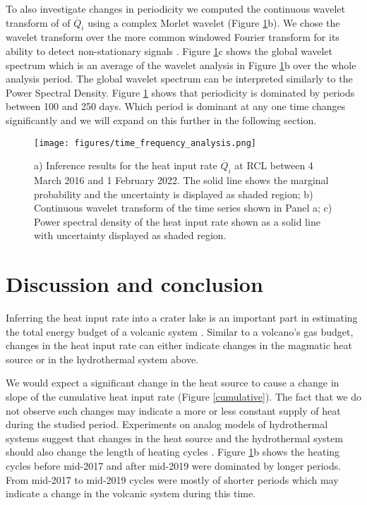 \documentclass{bmcart}
\begin{document}
To also investigate changes in periodicity we computed the continuous wavelet
transform of of $\dot{Q_i}$ using a complex Morlet wavelet (Figure
\ref{inference_result}b). We chose the wavelet transform over the more common
windowed Fourier transform for its ability to detect non-stationary signals
\cite{torrencePracticalGuideWavelet1998}. Figure \ref{inference_result}c shows
the global wavelet spectrum which is an average of the wavelet analysis in
Figure \ref{inference_result}b over the whole analysis period. The global
wavelet spectrum can be interpreted similarly to the Power Spectral Density.
Figure \ref{inference_result} shows that periodicity is dominated by periods
between 100 and 250 days. Which period is dominant at any one time changes
significantly and we will expand on this further in the following section.  

\begin{figure}
 	\texttt{[image: figures/time\_frequency\_analysis.png]}  
    \caption{ a) Inference results for the heat input rate $\dot{Q_i}$ at RCL
             between 4 March 2016 and 1 February 2022. The solid line shows the
             marginal probability and the uncertainty is displayed as shaded
             region; b) Continuous wavelet transform of the time series shown in
             Panel a; c) Power spectral density of the heat input rate shown as a
             solid line with uncertainty displayed as shaded region.}
\label{inference_result}
\end{figure}

\section{Discussion and conclusion}
Inferring the heat input rate into a crater lake is an important part in
estimating the total energy budget of a volcanic system \cite{Brown1989a}.
Similar to a volcano's gas budget, changes in the heat input rate can either
indicate changes in the magmatic heat source or in the hydrothermal system
above.  

We would expect a significant change in the heat source to cause a change in
slope of the cumulative heat input rate (Figure \ref{cumulative}). The fact that
we do not observe such changes may indicate a more or less constant supply of
heat during the studied period. Experiments on analog models of hydrothermal
systems suggest that changes in the heat source and the hydrothermal system
should also change the length of heating cycles
\cite{vandemeulebrouckAnalogueModelingInstabilities2005,fitzgerald1997TwentySecondWorkshop}.
Figure \ref{inference_result}b shows the heating cycles before mid-2017 and
after mid-2019 were dominated by longer periods. From mid-2017 to mid-2019
cycles were mostly of shorter periods which may indicate a change in the
volcanic system during this time. 
\end{document}
